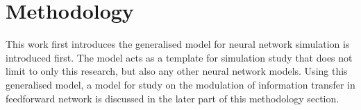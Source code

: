 \chapter{Methodology}
This work first introduces the generalised model for neural network simulation is introduced first. The model acts as a template for simulation study that does not limit to only this research, but also any other neural network models. Using this generalised model, a model for study on the modulation of information transfer in feedforward network is discussed in the later part of this methodology section. 
